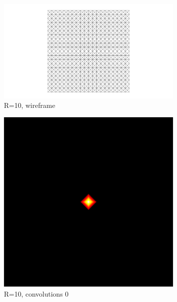 \begin{figure}[ht]
	\bigskip
	\begin{subfigure}[b]{0.32\linewidth}
		\includegraphics[width=\linewidth]
		{data/synthetic_meshes/square_tesselation_4tri_Dirac_delta_10_v841_f1600_wireframe.png}
		\caption{R=10, wireframe}\label{fig:sq2.d}
	\end{subfigure}
	\begin{subfigure}[b]{0.32\linewidth}
		\includegraphics[width=\linewidth]
		{data/synthetic_meshes/square_tesselation_4tri_Dirac_delta_10_v841_f1600_funcvals_0iter.png}
		\caption{R=10, convolutions 0}\label{fig:sq2.e}
	\end{subfigure}
	\begin{subfigure}[b]{0.32\linewidth}

\end{subfigure}
\end{figure}
